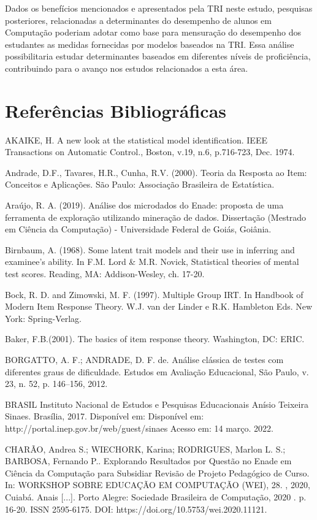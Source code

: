 \documentclass[12pt]{article}
\begin{document}
Dados os benefícios mencionados e apresentados pela TRI neste estudo, pesquisas posteriores, relacionadas a determinantes do desempenho de alunos em Computação poderiam adotar como base para mensuração do desempenho dos estudantes as medidas fornecidas por modelos baseados na TRI. Essa análise possibilitaria estudar determinantes baseados em diferentes níveis de proficiência, contribuindo para o avanço nos estudos relacionados a esta área.

\newpage
\section{Referências Bibliográficas}

AKAIKE, H. A new look at the statistical model identification. IEEE Transactions on Automatic
Control., Boston, v.19, n.6, p.716-723, Dec. 1974.

Andrade, D.F., Tavares, H.R., Cunha, R.V. (2000). Teoria da Resposta ao Item: Conceitos e Aplicações. São Paulo: Associação Brasileira de Estatística.

Araújo, R. A. (2019). Análise dos microdados do Enade: proposta de uma ferramenta de exploração utilizando mineração de dados. Dissertação (Mestrado em Ciência da Computação) - Universidade Federal de Goiás, Goiânia.

Birnbaum, A. (1968). Some latent trait models and their use in inferring and examinee's ability. In F.M. Lord \& M.R. Novick, Statistical theories of mental test scores. Reading, MA: Addison-Wesley, ch. 17-20.

Bock, R. D. and Zimowski, M. F. (1997). Multiple Group IRT. In Handbook of Modern Item Response Theory. W.J. van der Linder e R.K. Hambleton Eds. New York: Spring-Verlag.

Baker, F.B.(2001). The basics of item response theory. Washington, DC: ERIC. 

BORGATTO, A. F.; ANDRADE, D. F. de. Análise clássica de testes com diferentes graus de dificuldade. Estudos em Avaliação Educacional, São Paulo, v. 23, n. 52, p. 146–156, 2012.

BRASIL Instituto Nacional de Estudos e Pesquisas Educacionais Anísio Teixeira Sinaes. Brasília, 2017. Disponível em: Disponível em: http://portal.inep.gov.br/web/guest/sinaes Acesso em: 14 março. 2022.

CHARÃO, Andrea S.; WIECHORK, Karina; RODRIGUES, Marlon L. S.; BARBOSA, Fernando P.. Explorando Resultados por Questão no Enade em Ciência da Computação para Subsidiar Revisão de Projeto Pedagógico de Curso. In: WORKSHOP SOBRE EDUCAÇÃO EM COMPUTAÇÃO (WEI), 28. , 2020, Cuiabá. Anais [...]. Porto Alegre: Sociedade Brasileira de Computação, 2020 . p. 16-20. ISSN 2595-6175. DOI: https://doi.org/10.5753/wei.2020.11121.
\end{document}
